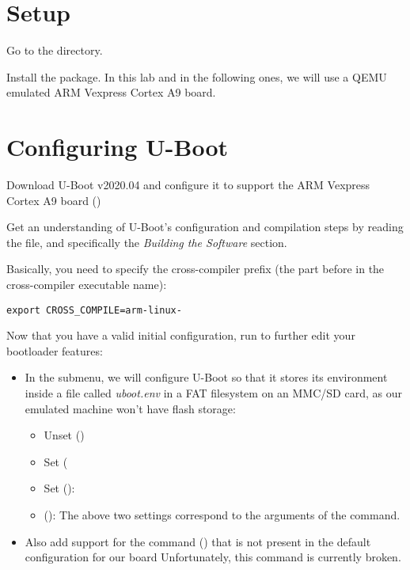 
\section{Setup}

Go to the  directory.

Install the  package. In this lab and in the
following ones, we will use a QEMU emulated ARM Vexpress Cortex A9 board.

\section{Configuring U-Boot}

Download U-Boot v2020.04 and configure it
to support the ARM Vexpress Cortex A9 board
()

Get an understanding of U-Boot's configuration and compilation steps
by reading the  file, and specifically the {\em Building
the Software} section.

Basically, you need to specify the cross-compiler prefix
(the part before  in the cross-compiler executable name):
\begin{verbatim}
export CROSS_COMPILE=arm-linux-
\end{verbatim}

Now that you have a valid initial configuration, run 
to further edit your bootloader features:

\begin{itemize}
\item In the  submenu, we will configure U-Boot so
    that it stores its environment inside a file called {\em
    uboot.env} in a FAT filesystem on an MMC/SD card, as our emulated
    machine won't have flash storage:
    \begin{itemize}
    \item Unset  ()
    \item Set  (
    \item Set  (): 
    \item {} (): \newline
        The above two settings correspond to the arguments of the
         command.
    \end{itemize}
  \item Also add support for the  command ()
    that is not present in the default configuration for our board
    Unfortunately, this command is currently broken.
\end{itemize}

